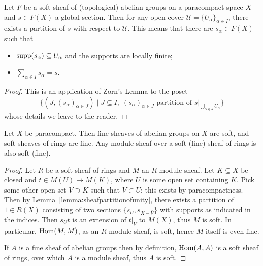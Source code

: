 \documentclass[a4paper,openany]{scrbook}
\begin{document}
\begin{lemma}\label{lemma:sheafpartitionofunity}
Let $F$ be a soft sheaf of (topological) abelian groups on a paracompact space $X$ and $s \in F(X)$ a global section. Then for any open cover $\mathcal U = \{U_\alpha\}_{\alpha \in I}$, there exists a partition of $s$ with respect to $\mathcal U$. This means that there are $s_\alpha \in F(X)$ such that
\begin{itemize}
\item $\operatorname{supp}(s_\alpha) \subseteq U_\alpha$ and the supports are locally finite;
\item $\sum_{\alpha \in I} s_\alpha = s$.
\end{itemize}
\end{lemma}
\begin{proof}
This is an application of Zorn's Lemma to the poset
\[
\{(J,(s_\alpha)_{\alpha \in J}) \mid J \subseteq I,\; (s_\alpha)_{\alpha \in J} \text{ partition of }s|_{\bigcup_{\alpha \in J} U_\alpha}\}
\]
whose details we leave to the reader.
\end{proof}

\begin{prop}\label{prop:finesoftsheaves}
Let $X$ be paracompact. Then fine sheaves of abelian groups on $X$ are soft, and soft sheaves of rings are fine. Any module sheaf over a soft (fine) sheaf of rings is also soft (fine).
\end{prop}
\begin{proof}
Let $R$ be a soft sheaf of rings and $M$ an $R$-module sheaf. Let $K \subseteq X$ be closed and $t \in M(U) \to M(K)$, where $U$ is some open set containing $K$. Pick some other open set $V \supset K$ such that $\overline V \subset U$; this exists by paracompactness. Then by Lemma~\ref{lemma:sheafpartitionofunity}, there exists a partition of $1 \in R(X)$ consisting of two sections $\{s_U,s_{X-\overline V}\}$ with supports as indicated in the indices. Then $s_U t$ is an extension of $t|_V$ to $M(X)$, thus $M$ is soft. In particular, $\operatorname{Hom}(M,M)$, as an $R$-module sheaf, is soft, hence $M$ itself is even fine.

If $A$ is a fine sheaf of abelian groups then by definition, $\operatorname{Hom}(A,A)$ is a soft sheaf of rings, over which $A$ is a module sheaf, thus $A$ is soft.
\end{proof}
\end{document}
